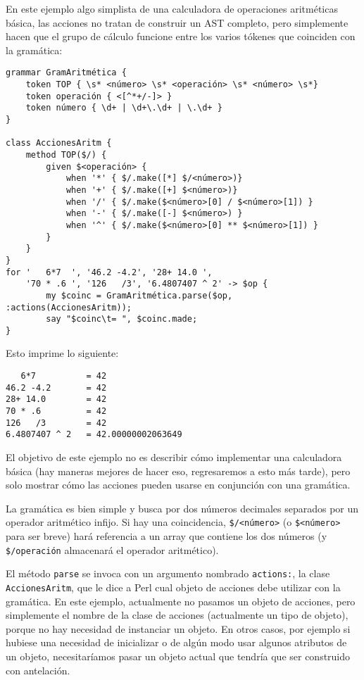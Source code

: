 En este ejemplo algo simplista de una calculadora de operaciones
aritméticas básica, las acciones no tratan de construir un AST 
completo, pero simplemente hacen que el grupo de cálculo funcione
entre los varios tókenes que coinciden con la gramática:

\begin{lstlisting}
grammar GramAritmética {
    token TOP { \s* <número> \s* <operación> \s* <número> \s*}
    token operación { <[^*+/-]> }
    token número { \d+ | \d+\.\d+ | \.\d+ }
}

class AccionesAritm {
    method TOP($/) {
        given $<operación> {
            when '*' { $/.make([*] $/<número>)}
            when '+' { $/.make([+] $<número>)}
            when '/' { $/.make($<número>[0] / $<número>[1]) }
            when '-' { $/.make([-] $<número>) }
            when '^' { $/.make($<número>[0] ** $<número>[1]) }
        }
    }
}
for '   6*7  ', '46.2 -4.2', '28+ 14.0 ',
    '70 * .6 ', '126   /3', '6.4807407 ^ 2' -> $op {
        my $coinc = GramAritmética.parse($op, :actions(AccionesAritm));
        say "$coinc\t= ", $coinc.made;
}
\end{lstlisting}

Esto imprime lo siguiente:

\begin{lstlisting}
   6*7          = 42
46.2 -4.2       = 42
28+ 14.0        = 42
70 * .6         = 42
126   /3        = 42
6.4807407 ^ 2   = 42.00000002063649
\end{lstlisting}

El objetivo de este ejemplo no es describir cómo implementar una
calculadora básica (hay maneras mejores de hacer eso, regresaremos
a esto más tarde), pero solo mostrar cómo las acciones pueden usarse
en conjunción con una gramática.

La gramática es bien simple y busca por dos números decimales separados
por un operador aritmético infijo. Si hay una coincidencia, 
\verb|$/<número>| (o \verb|$<número>| para ser breve) hará referencia
a un array que contiene los dos números (y \verb|$/operación| almacenará
el operador aritmético).

El método {\tt parse} se invoca con un argumento nombrado {\tt actions:},
la clase {\tt  AccionesAritm}, que le dice a Perl cual objeto de
acciones debe utilizar con la gramática. En este ejemplo, actualmente no pasamos
un objeto de acciones, pero simplemente el nombre de la clase
de acciones (actualmente un tipo de objeto), porque no hay 
necesidad de instanciar un objeto. En otros casos, por ejemplo si
hubiese una necesidad de inicializar o de algún modo usar
algunos atributos de un objeto, necesitaríamos pasar un 
objeto actual que tendría que ser construido con antelación.

